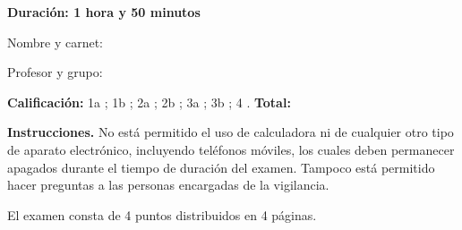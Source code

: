 \documentclass[11pt]{article}
\begin{document}
\examheader

\vspace{4pt}
\noindent
\begin{minipage}[t]{0.62\linewidth}
\textbf{Duración: 1 hora y 50 minutos}

\vspace{8pt}
Nombre y carnet: \dotfill

\vspace{6pt}
Profesor y grupo: \dotfill
\end{minipage}

\vspace{8pt}
\noindent\textbf{Calificación:} 1a \dotfill; 1b \dotfill; 2a \dotfill; 2b \dotfill; 3a \dotfill; 3b \dotfill; 4 \dotfill. \textbf{Total:} \dotfill

\vspace{6pt}
\noindent\textbf{Instrucciones.} No está permitido el uso de calculadora ni de cualquier otro tipo de aparato electrónico, incluyendo teléfonos móviles, los cuales deben permanecer apagados durante el tiempo de duración del examen. Tampoco está permitido hacer preguntas a las personas encargadas de la vigilancia.

\vspace{4pt}
\noindent El examen consta de 4 puntos distribuidos en 4 páginas.
\end{document}
